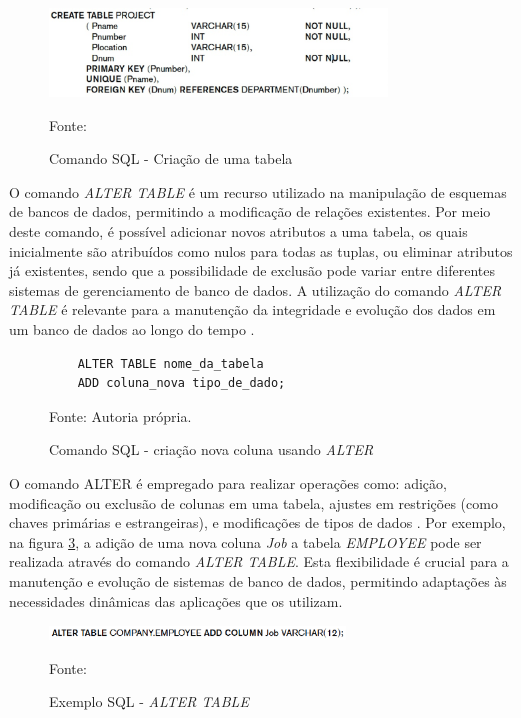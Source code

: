 \begin{figure}[H]
    \centering
    \includegraphics[width=0.8\textwidth]{figuras/create_table_elmasi.eps}
    \caption{Comando SQL - Criação de uma tabela}
    Fonte: \cite{elmasri2011fundamentals}
    \label{fig:create_table}
\end{figure}



O comando \textit{ALTER TABLE} é um recurso utilizado na manipulação de esquemas de bancos de dados, permitindo a modificação de relações existentes. Por meio deste comando, é possível adicionar novos atributos a uma tabela, os quais inicialmente são atribuídos como nulos para todas as tuplas, ou eliminar atributos já existentes, sendo que a possibilidade de exclusão pode variar entre diferentes sistemas de gerenciamento de banco de dados. A utilização do comando \textit{ALTER TABLE} é relevante para a manutenção da integridade e evolução dos dados em um banco de dados ao longo do tempo \cite{silberschatz2011database}.


\begin{figure}[H]
    \centering
    \begin{lstlisting}
    ALTER TABLE nome_da_tabela
    ADD coluna_nova tipo_de_dado;
    \end{lstlisting}
    \caption{Comando SQL - criação nova coluna usando \textit{ALTER}}
    Fonte: Autoria própria.
    \label{lst:sql_alter}
\end{figure}


O comando ALTER é empregado para realizar  operações como:  adição, modificação ou exclusão de colunas em uma tabela, ajustes em restrições (como chaves primárias e estrangeiras), e modificações de tipos de dados \cite{silberschatz2011database}. Por exemplo, na figura \ref{fig:alter_table}, a adição de uma nova coluna \textit{Job} a tabela \textit{EMPLOYEE} pode ser realizada através do comando \textit{ALTER TABLE}. Esta flexibilidade é crucial para a manutenção e evolução de sistemas de banco de dados, permitindo adaptações às necessidades dinâmicas das aplicações que os utilizam.

\begin{figure}[H]
    \centering
    \includegraphics[width=0.7\textwidth]{figuras/alter_table_elmasi.eps}
    \caption{Exemplo SQL - \textit{ALTER TABLE}}
    Fonte: \cite{elmasri2011fundamentals}
    \label{fig:alter_table}
\end{figure}

